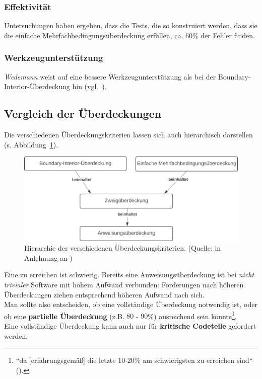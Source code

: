 \subsubsection*{Effektivität}
Untersuchungen haben ergeben, dass die Tests, die so konstruiert werden, dass sie die einfache Mehrfachbedingungsüberdeckung  erfüllen, ca. 60\% der Fehler finden.

\subsubsection*{Werkzeugunterstützung}
\textit{Wedemann} weist auf eine bessere Werkzeugunterstützung als bei der Boundary-Interior-Überdeckung hin (vgl.~\cite[53]{Wed09c}).

\subsection{Vergleich der Überdeckungen}

Die verschiedenen Überdeckungskriterien lassen sich auch hierarchisch darstellen (s. Abbildung~\ref{fig:coverage-criteria-hierarchy}).

\begin{figure}
    \centering
    \includegraphics[scale=0.4]{part four/Testende Verfahren/img/coverage-criteria-hierarchy}
    \caption{Hierarchie der verschiedenen Überdeckungskriterien. (Quelle: in Anlehnung an \cite[Abb. 5.2, 53]{Wed09c})}
    \label{fig:coverage-criteria-hierarchy}
\end{figure}

 \noindent
Eine  zu erreichen ist schwierig.
Bereits eine Anweisungsüberdeckung ist bei \textit{nicht trivialer} Software mit hohem Aufwand verbunden: Forderungen nach höheren Überdeckungen ziehen entsprechend höheren Aufwand nach sich.\\
Man sollte also entscheiden, ob eine vollständige Überdeckung notwendig ist, oder ob eine \textbf{partielle Überdeckung} (z.B. $80$ - $90$\%) ausreichend sein könnte\footnote{
``da [erfahrungsgemäß] die letzte 10-20\% am schwierigsten zu erreichen sind`` (\cite[54]{Wed09c}).
}.\\
Eine vollständige Überdeckung kann auch nur für \textbf{kritische Codeteile} gefordert werden.\\

